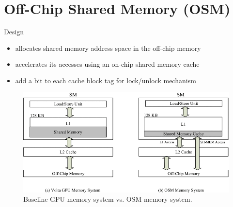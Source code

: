 \documentclass[
    fontset=fandol,
    xcolor=svgnames %
]{ctexbeamer}
\begin{document}
\section{Off-Chip Shared Memory (OSM)}

\begin{frame}

    \begin{block}{Design}
        \begin{itemize}
            \item allocates shared memory address space in the off-chip memory
            \item accelerates its accesses using an on-chip shared memory cache
            \item add a bit to each cache block tag for lock/unlock mechanism
        \end{itemize}
    \end{block}

    \begin{figure}
        \includegraphics[height=0.5\textheight]{assets/figure/sadro5-3154315-large.png}
        \caption{Baseline GPU memory system vs. OSM memory system.}
    \end{figure}

\end{frame}
\end{document}
